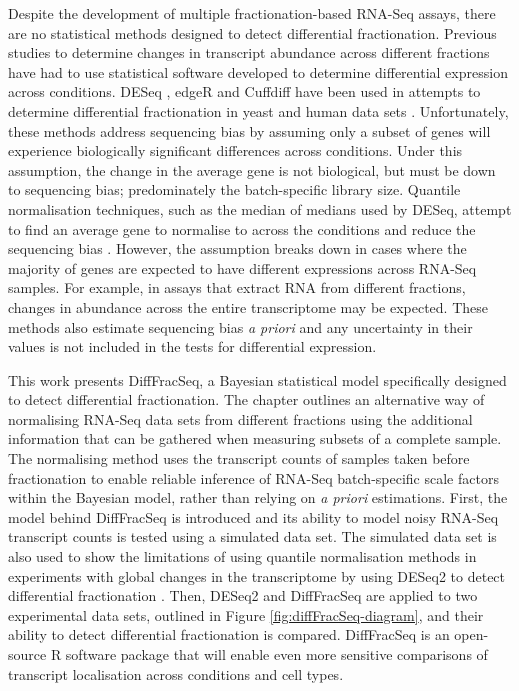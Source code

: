 \documentclass[../main.tex]{subfiles}
\begin{document}
Despite the development of multiple fractionation-based RNA-Seq assays, there are no statistical methods designed to detect differential fractionation.
Previous studies to determine changes in transcript abundance across different fractions have had to use statistical software developed to determine differential expression across conditions. 
DESeq \parencite{Anders2010}, edgeR \parencite{Robinson2010} and Cuffdiff \parencite{Trapnell2010} have been used in attempts to determine differential fractionation in yeast and human data sets \parencite{Khong2017, Matheny2019, VanTreeck2018, Hubstenberger2017}. 
Unfortunately, these methods address sequencing bias by assuming only a subset of genes will experience biologically significant differences across conditions. 
Under this assumption, the change in the average gene is not biological, but must be down to sequencing bias; predominately the batch-specific library size.
Quantile normalisation techniques, such as the median of medians used by DESeq, attempt to find an average gene to normalise to across the conditions and reduce the sequencing bias \parencite{Anders2010}.
However, the assumption breaks down in cases where the majority of genes are expected to have different expressions across RNA-Seq samples. 
For example, in assays that extract RNA from different fractions, changes in abundance across the entire transcriptome may be expected.
These methods also estimate sequencing bias \textit{a priori} and any uncertainty in their values is not included in the tests for differential expression.


This work presents DiffFracSeq, a Bayesian statistical model specifically designed to detect differential fractionation.
The chapter outlines an alternative way of normalising RNA-Seq data sets from different fractions using the additional information that can be gathered when measuring subsets of a complete sample.
The normalising method uses the transcript counts of samples taken before fractionation to enable reliable inference of RNA-Seq batch-specific scale factors within the Bayesian model, rather than relying on \textit{a priori} estimations.
First, the model behind DiffFracSeq is introduced and its ability to model noisy RNA-Seq transcript counts is tested using a simulated data set. 
The simulated data set is also used to show the limitations of using quantile normalisation methods in experiments with global changes in the transcriptome by using DESeq2 to detect differential fractionation \parencite{Love2014}.
Then, DESeq2 and DiffFracSeq are applied to two experimental data sets, outlined in Figure \ref{fig:diffFracSeq-diagram}, and their ability to detect differential fractionation is compared.
DiffFracSeq is an open-source R software package that will enable even more sensitive comparisons of transcript localisation across conditions and cell types.
\end{document}
